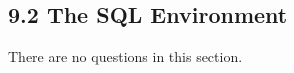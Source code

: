 \documentclass[../../main.tex]{subfiles}
\begin{document}
\subsection{9.2 The SQL Environment}

There are no questions in this section.
\end{document}
